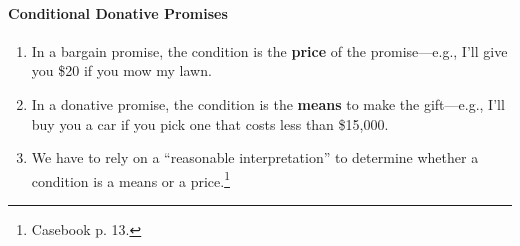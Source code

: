 \paragraph{Conditional Donative Promises}

\begin{enumerate}
    \item In a bargain promise, the condition is the \textbf{price} of the 
    promise---e.g., I'll give you \$20 if you mow my lawn.
    \item In a donative promise, the condition is the \textbf{means} to make 
    the gift---e.g., I'll buy you a car if you pick one that costs less than 
    \$15,000. 
    \item We have to rely on a ``reasonable interpretation'' to determine 
    whether a condition is a means or a price.\footnote{Casebook p. 13.}
\end{enumerate}

